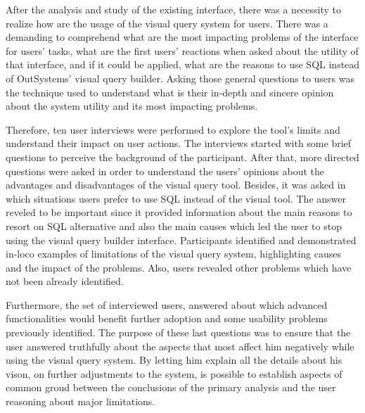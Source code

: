 After the analysis and study of the existing interface, there was a necessity to realize how are the usage of the visual query system for users. There was a demanding to comprehend what are the most impacting problems of the interface for users' tasks, what are the first users' reactions when asked about the utility of that interface, and if it could be applied, what are the reasons to use \gls{SQL} instead of OutSystems' visual query builder. Asking those general questions to users was the technique used to understand what is their in-depth and sincere opinion about the system utility and its most impacting problems.

Therefore, ten user interviews were performed to explore the tool's limits and understand their impact on user actions. The interviews started with some brief questions to perceive the background of the participant. After that, more directed questions were asked in order to understand the users' opinions about the advantages and disadvantages of the visual query tool. Besides, it was asked in which situations users prefer to use \gls{SQL} instead of the visual tool. The answer reveled to be important since it provided information about the main reasons to resort on \gls{SQL} alternative and also the main causes which led the user to stop using the visual query builder interface. Participants identified and demonstrated in-loco examples of limitations of the visual query system, highlighting causes and the impact of the problems. Also, users revealed other problems which have not been already identified.

Furthermore, the set of interviewed users, answered about which advanced functionalities would benefit further adoption and some usability problems previously identified. The purpose of these last questions was to ensure that the user answered truthfully about the aspects that most affect him negatively while using the visual query system. By letting him explain all the details about his vison, on further adjustments to the system, is possible to establish aspects of common groud between the conclusions of the primary analysis and the user reasoning about major limitations.

